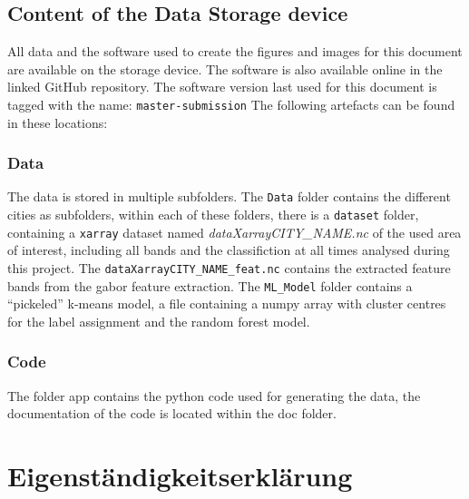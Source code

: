 \documentclass[12pt,a4paper, english,twoside]{article}
\begin{document}
  \subsection{Content of the Data Storage device}
    All data and the software used to create the figures and images for this document are available on the storage device.
    The software is also available online in the linked GitHub repository.
    The software version last used for this document is tagged with the name: \texttt{master-submission}
    The following artefacts can be found in these locations:
  \subsubsection{Data}
    The data is stored in multiple subfolders. 
    The \texttt{Data} folder contains the different cities as subfolders, within each of these folders, there is a \texttt{dataset} folder, containing a \texttt{xarray} dataset named \textit{dataXarrayCITY\_NAME.nc} of the used area of interest, including all bands and the classifiction at all times analysed during this project. 
    The \texttt{dataXarrayCITY\_NAME\_feat.nc} contains the extracted feature bands from the gabor feature extraction.
    The \texttt{ML\_Model} folder contains a ``pickeled'' k-means model, a file containing a numpy array with cluster centres for the label assignment and the random forest model. 
    \subsubsection{Code}\label{sec:code}
      The folder app contains the python code used for generating the data, the documentation of the code is located within the doc folder.
\newpage
\printbibliography%
\newpage
\section*{Eigenständigkeitserklärung}

\end{document}
